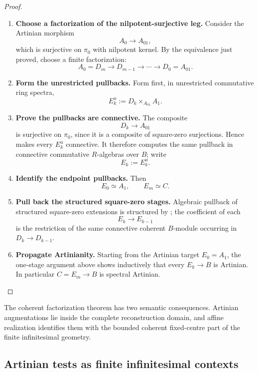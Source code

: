 \begin{proof}
\begin{enumerate}[label=\textup{(\arabic*)}]
\[        \pi_0(A')\longrightarrow\pi_0(A)
    \]
    is surjective with nilpotent kernel. This proves \textup{(i)}.
    \item \textbf{Choose a factorization of the nilpotent-surjective leg.}
    Consider the Artinian morphism
    \[
        A_0\longrightarrow A_{01},
    \]
    which is surjective on \(\pi_0\) with nilpotent kernel. By the equivalence
    just proved, choose a finite factorization:
    \[
        A_0=D_m
        \longrightarrow
        D_{m-1}
        \longrightarrow
        \cdots
        \longrightarrow
        D_0=A_{01}.
    \]
    \item \textbf{Form the unrestricted pullbacks.}
    Form first, in unrestricted commutative ring spectra,
    \[
        E_k^u:=D_k\times_{A_{01}}A_1.
    \]
    \item \textbf{Prove the pullbacks are connective.}
    The composite
    \[
        D_k\longrightarrow A_{01}
    \]
    is surjective on \(\pi_0\), since it is a composite of square-zero
    surjections. Hence
     makes every \(E_k^u\)
    connective. It therefore computes the same pullback in connective
    commutative \(R\)-algebras over \(B\); write
    \[
        E_k:=E_k^u.
    \]
    \item \textbf{Identify the endpoint pullbacks.}
    Then
    \[
        E_0\simeq A_1,
        \qquad
        E_m\simeq C.
    \]
    \item \textbf{Pull back the structured square-zero stages.}
    Algebraic pullback of structured square-zero extensions is structured by
    ; the coefficient of each
    \[
        E_k\longrightarrow E_{k-1}
    \]
    is the restriction of the same connective coherent \(B\)-module occurring in
    \(D_k\to D_{k-1}\).
    \item \textbf{Propagate Artinianity.}
    Starting from the Artinian target \(E_0=A_1\), the
    one-stage argument above shows inductively that every \(E_k\to B\) is
    Artinian. In particular \(C=E_m\to B\) is spectral Artinian.
\end{enumerate}
\end{proof}


The coherent factorization theorem has two semantic consequences. Artinian augmentations
lie inside the complete reconstruction domain, and affine realization identifies them
with the bounded coherent fixed-centre part of the finite infinitesimal geometry.

\subsection{Artinian tests as finite infinitesimal contexts}

